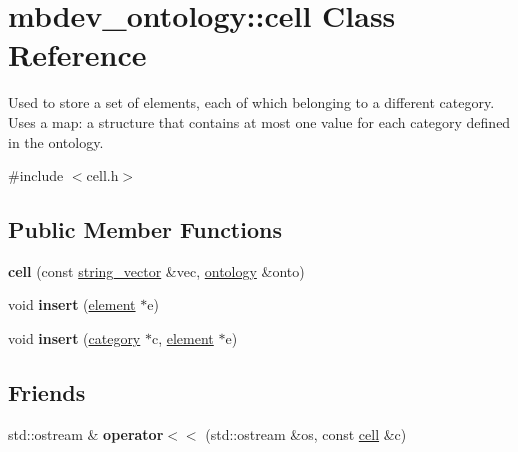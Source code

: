 \hypertarget{classmbdev__ontology_1_1cell}{\section{mbdev\-\_\-ontology\-:\-:cell \-Class \-Reference}
\label{classmbdev__ontology_1_1cell}
}


\-Used to store a set of elements, each of which belonging to a different category. \-Uses a map\-: a structure that contains at most one value for each category defined in the ontology.  




{\ttfamily \#include $<$cell.\-h$>$}

\subsection*{\-Public \-Member \-Functions}
\begin{DoxyCompactItemize}
\item 
\hypertarget{classmbdev__ontology_1_1cell_ab940fc0fd635d5d6924bf7a8ba7acb3d}{{\bfseries cell} (const \hyperlink{classmbdev_1_1string__vector}{string\-\_\-vector} \&vec, \hyperlink{classmbdev__ontology_1_1ontology}{ontology} \&onto)}\label{classmbdev__ontology_1_1cell_ab940fc0fd635d5d6924bf7a8ba7acb3d}

\item 
\hypertarget{classmbdev__ontology_1_1cell_ae19060aca87c166b4e4beeda191f79a9}{void {\bfseries insert} (\hyperlink{classmbdev__ontology_1_1element}{element} $\ast$e)}\label{classmbdev__ontology_1_1cell_ae19060aca87c166b4e4beeda191f79a9}

\item 
\hypertarget{classmbdev__ontology_1_1cell_aa9d59dd81d6576eaeda7710dbe1287d3}{void {\bfseries insert} (\hyperlink{classmbdev__ontology_1_1category}{category} $\ast$c, \hyperlink{classmbdev__ontology_1_1element}{element} $\ast$e)}\label{classmbdev__ontology_1_1cell_aa9d59dd81d6576eaeda7710dbe1287d3}

\end{DoxyCompactItemize}
\subsection*{\-Friends}
\begin{DoxyCompactItemize}
\item 
\hypertarget{classmbdev__ontology_1_1cell_a89fd6ed708bc15412d8b747802499dc9}{std\-::ostream \& {\bfseries operator$<$$<$} (std\-::ostream \&os, const \hyperlink{classmbdev__ontology_1_1cell}{cell} \&c)}\label{classmbdev__ontology_1_1cell_a89fd6ed708bc15412d8b747802499dc9}

\end{DoxyCompactItemize}


